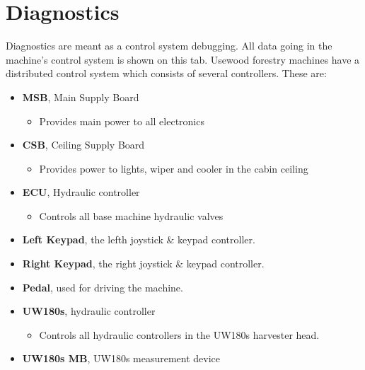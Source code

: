\documentclass[12pt,a4paper,english]{uvmanual}
\begin{document}


\section{Diagnostics}\label{ch:system_diagnostics}

Diagnostics are meant as a control system debugging. All data going in the machine's control system is shown on this tab. Usewood forestry machines have a distributed control system which consists of several controllers. These are:

\begin{itemize}
 \item \textbf{MSB}, Main Supply Board
 \begin{itemize}
  \item Provides main power to all electronics
 \end{itemize}

 \item \textbf{CSB}, Ceiling Supply Board
 \begin{itemize}
  \item Provides power to lights, wiper and cooler in the cabin ceiling
 \end{itemize}

 \item \textbf{ECU}, Hydraulic controller
 \begin{itemize}
  \item Controls all base machine hydraulic valves
 \end{itemize}

 \item \textbf{Left Keypad}, the lefth joystick \& keypad controller.

 \item \textbf{Right Keypad}, the right joystick \& keypad controller.

 \item \textbf{Pedal}, used for driving the machine.

 \item \textbf{UW180s}, hydraulic controller
 \begin{itemize}
  \item Controls all hydraulic controllers in the UW180s harvester head.
 \end{itemize}

 \item \textbf{UW180s MB}, UW180s measurement device

\end{itemize}
\end{document}
